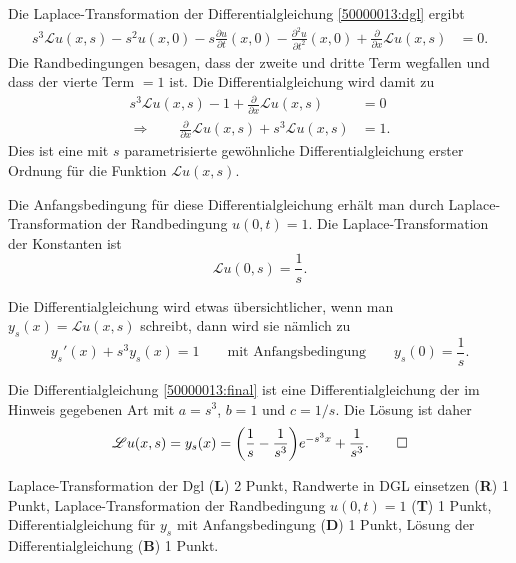 \begin{loesung}
\begin{teilaufgaben}
\item
Die Laplace-Transformation der Differentialgleichung \eqref{50000013:dgl}
ergibt
\begin{align*}
s^3 \mathscr{L}u(x,s)
-s^2 u(x,0)
-s\frac{\partial u}{\partial t}(x,0)
-\frac{\partial^2 u}{\partial t^2}(x,0)
+
\frac{\partial}{\partial x}\mathscr{L}u(x,s)
&=
0.
\end{align*}
Die Randbedingungen besagen, dass der zweite und dritte Term wegfallen
und dass der vierte Term $=1$ ist.
Die Differentialgleichung wird damit zu
\begin{align*}
s^3 \mathscr{L}u(x,s)
-1
+
\frac{\partial}{\partial x}\mathscr{L}u(x,s)
&=
0
\\
\Rightarrow\qquad
\frac{\partial}{\partial x}\mathscr{L}u(x,s)
+
s^3 \mathscr{L}u(x,s)
&=
1.
\end{align*}
Dies ist eine mit $s$ parametrisierte gewöhnliche Differentialgleichung
erster Ordnung für die Funktion $\mathscr{L}u(x,s)$.

Die Anfangsbedingung für diese Differentialgleichung erhält man durch
Laplace-Trans\-for\-ma\-tion der Randbedingung $u(0,t)=1$.
Die Laplace-Transformation der Konstanten ist
\[
\mathscr{L}u(0,s) = \frac1s.
\]

Die Differentialgleichung wird etwas übersichtlicher, wenn man
$y_s(x) = \mathscr{L}u(x,s)$ schreibt, dann wird sie nämlich zu
\begin{equation}
y_s'(x) + s^3 y_s(x)=1
\qquad\text{mit Anfangsbedingung}\qquad
y_s(0)=\frac1s.
\label{50000013:final}
\end{equation}

\item
Die Differentialgleichung \eqref{50000013:final} ist eine Differentialgleichung
der im Hinweis gegebenen Art mit $a=s^3$, $b=1$ und $c=1/s$.
Die Lösung ist daher
\[
\mathscr{L}u(x,s)
=
y_s(x)
=
\biggl(\frac1s-\frac1{s^3}\biggr)e^{-s^3x} + \frac{1}{s^3}.
\qedhere
\]
\end{teilaufgaben}
\end{loesung}

\begin{bewertung}
Laplace-Transformation der Dgl ({\bf L}) 2 Punkt,
Randwerte in DGL einsetzen ({\bf R}) 1 Punkt,
Laplace-Transformation der Randbedingung $u(0,t)=1$ ({\bf T}) 1 Punkt,
Differentialgleichung für $y_s$ mit Anfangsbedingung ({\bf D}) 1 Punkt,
Lösung der Differentialgleichung ({\bf B}) 1 Punkt.
\end{bewertung}

